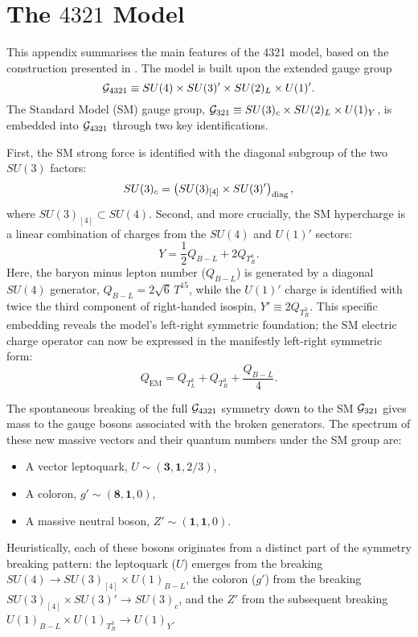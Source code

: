 \chapter{The $4321$ Model}
\label{sec:4321}

This appendix summarises the main features of the 4321 model, based on the construction presented in \cite{DiLuzio:2017vat, DiLuzio2018}. The model is built upon the extended gauge group
\[
\mathcal{G}_{\rm 4321} \equiv SU(4) \times SU(3)' \times SU(2)_L \times U(1)'.
\]
The Standard Model (SM) gauge group, $\mathcal{G}_{\rm 321} \equiv SU(3)_c \times SU(2)_L \times U(1)_Y$, is embedded into $\mathcal{G}_{\rm 4321}$ through two key identifications.

First, the SM strong force is identified with the diagonal subgroup of the two $SU(3)$ factors:
\begin{equation}
SU(3)_c = \left( SU(3)_{[4]} \times SU(3)' \right)_{\rm diag},
\end{equation}
where $SU(3)_{[4]} \subset SU(4)$. Second, and more crucially, the SM hypercharge is a linear combination of charges from the $SU(4)$ and $U(1)'$ sectors:
\begin{equation}
Y = \frac{1}{2}Q_{B-L} + 2Q_{T^3_R}.
\end{equation}
Here, the baryon minus lepton number ($Q_{B-L}$) is generated by a diagonal $SU(4)$ generator, $Q_{B-L} = 2\sqrt{6} \, T^{15}$, while the $U(1)'$ charge is identified with twice the third component of right-handed isospin, $Y' \equiv 2Q_{T^3_R}$. This specific embedding reveals the model's left-right symmetric foundation; the SM electric charge operator can now be expressed in the manifestly left-right symmetric form:
\begin{equation}
Q_{\text{EM}} = Q_{T^3_L} + Q_{T^3_R} + \frac{Q_{B-L}}{4}.
\end{equation}

The spontaneous breaking of the full $\mathcal{G}_{\rm 4321}$ symmetry down to the SM $\mathcal{G}_{\rm 321}$ gives mass to the gauge bosons associated with the broken generators. The spectrum of these new massive vectors and their quantum numbers under the SM group are:
\begin{itemize}
    \item A vector leptoquark, $U \sim (\mathbf{3},\mathbf{1},2/3)$,
    \item A coloron, $g' \sim (\mathbf{8},\mathbf{1},0)$,
    \item A massive neutral boson, $Z' \sim (\mathbf{1},\mathbf{1},0)$.
\end{itemize}
Heuristically, each of these bosons originates from a distinct part of the symmetry breaking pattern: the leptoquark ($U$) emerges from the breaking $SU(4)\to SU(3)_{[4]}\times U(1)_{B-L}$, the coloron ($g'$) from the breaking $SU(3)_{[4]}\times SU(3)'\to SU(3)_c$, and the $Z'$ from the subsequent breaking $U(1)_{B-L}\times U(1)_{T_R^3}\to U(1)_Y$.

